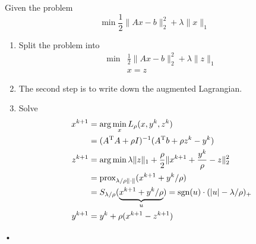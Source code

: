 Given the problem
\[
\min\frac{1}{2}\|Ax-b\|_2^2+\lambda\|x\|_1
\]
\begin{enumerate}
\item
Split the problem into
\[
\begin{array}{ll}
\min&\frac{1}{2}\|Ax-b\|_2^2+\lambda\|z\|_1\\
&x=z
\end{array}
\]
\item
The second step is to write down the augmented Lagrangian.
\item
Solve
\begin{align*}
x^{k+1}&=\arg\min_{x}L_\rho(x,y^k,z^k)\\
&=(A^{\mathrm T} A+\rho I)^{-1}(A^{\mathrm T} b + \rho z^k - y^k)\\
z^{k+1}&=\arg\min\lambda\|z\|_1+\frac{\rho}{2}\|x^{k+1}+\frac{y^k}{\rho} - z\|_2^2\\
&=\mbox{prox}_{\lambda/\rho \|\cdot\|}(x^{k+1} + y^k/\rho)\\
&=S_{\lambda/\rho}(\underbrace{x^{k+1} + y^k/\rho}_{u})=\mbox{sgn}(u)\cdot(|u| - \lambda/\rho)_+\\
y^{k+1} &= y^k+\rho(x^{k+1} - z^{k+1})
\end{align*}



\end{enumerate}•











